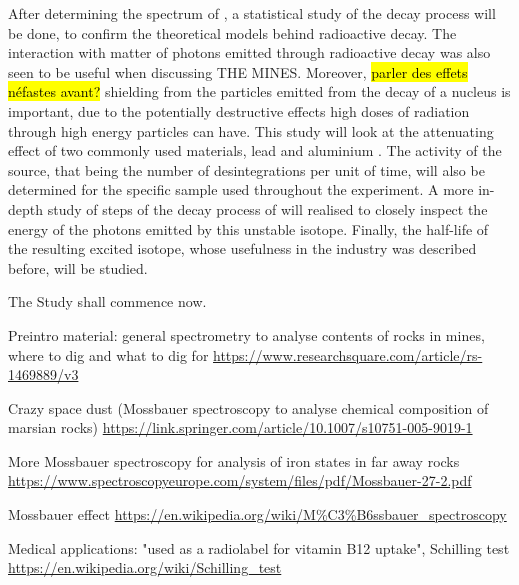 After determining the spectrum of \cobalt, a statistical study of the decay process will be done, to confirm the theoretical models behind radioactive decay.
The interaction with matter of photons emitted through radioactive decay was also seen to be useful when discussing THE MINES.
Moreover, \hl{parler des effets néfastes avant?} shielding from the particles emitted from the decay of a nucleus is important, due to the potentially destructive effects high doses of radiation through high energy particles can have.
This study will look at the attenuating effect of two commonly used materials, lead and aluminium \cite{my_ass}.
The activity of the source, that being the number of desintegrations per unit of time, will also be determined for the specific \cobalt sample used throughout the experiment.
A more in-depth study of steps of the decay process of \cobalt will realised to closely inspect the energy of the photons emitted by this unstable isotope.
Finally, the half-life of the resulting excited \iron isotope, whose usefulness in the industry was described before, will be studied.

The Study shall commence now.

Preintro material: general spectrometry to analyse contents of rocks in mines, where to dig and what to dig for \url{https://www.researchsquare.com/article/rs-1469889/v3} \cite{ramadhany_assessment_2022}

Crazy space dust (Mossbauer spectroscopy to analyse chemical composition of marsian rocks) \url{https://link.springer.com/article/10.1007/s10751-005-9019-1}

More Mossbauer spectroscopy for analysis of iron states in far away rocks \url{https://www.spectroscopyeurope.com/system/files/pdf/Mossbauer-27-2.pdf}

Mossbauer effect \url{https://en.wikipedia.org/wiki/M%C3%B6ssbauer_spectroscopy}

Medical applications: "used as a radiolabel for vitamin B12 uptake", Schilling test \url{https://en.wikipedia.org/wiki/Schilling_test}